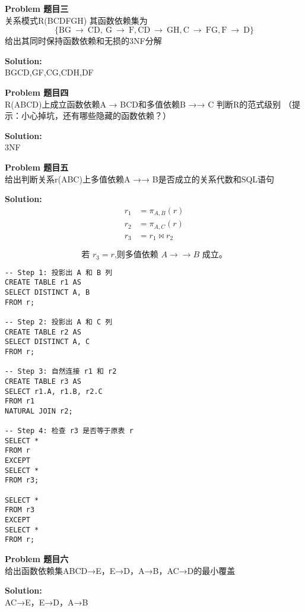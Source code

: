 \documentclass[12pt]{article} %
\newenvironment{problem}[2][Problem]
    { \begin{mdframed}[backgroundcolor=gray!20] \textbf{#1 #2} \\}
    {  \end{mdframed}}
\newenvironment{solution}
    { \begin{mdframed} \textbf{Solution:} \\}
    {  \end{mdframed}}
\begin{document}
\begin{problem}{题目三}
关系模式R(BCDFGH)
其函数依赖集为
\[\{\mathrm{BG~\to~CD,~G~\to~F,CD~\to~GH,C~\to~FG,F~\to~D}\}\]
给出其同时保持函数依赖和无损的3NF分解
\end{problem}
\begin{solution}
{BGCD},{GF},{CG},{CDH},{DF}
\end{solution}

\begin{problem}{题目四}
  R(ABCD)上成立函数依赖A → BCD和多值依赖B →→ C
    判断R的范式级别  
  （提示：小心掉坑，还有哪些隐藏的函数依赖？）
\end{problem}
\begin{solution}
  3NF
\end{solution}

\begin{problem}{题目五}
  给出判断关系r(ABC)上多值依赖A →→ B是否成立的关系代数和SQL语句
\end{problem}
\begin{solution}
\[\begin{aligned}r_1&=\pi_{A,B}(r)\\r_2&=\pi_{A,C}(r)\\r_3&=r_1\bowtie r_2\end{aligned}\]

\[\text{若 }r_{3}=r\text{,则多值依赖 }A\to\to B\text{ 成立。}\]

\begin{verbatim}
-- Step 1: 投影出 A 和 B 列
CREATE TABLE r1 AS
SELECT DISTINCT A, B
FROM r;

-- Step 2: 投影出 A 和 C 列
CREATE TABLE r2 AS
SELECT DISTINCT A, C
FROM r;

-- Step 3: 自然连接 r1 和 r2
CREATE TABLE r3 AS
SELECT r1.A, r1.B, r2.C
FROM r1
NATURAL JOIN r2;

-- Step 4: 检查 r3 是否等于原表 r
SELECT *
FROM r
EXCEPT
SELECT *
FROM r3;

SELECT *
FROM r3
EXCEPT
SELECT *
FROM r;
\end{verbatim}

\end{solution}

\begin{problem}{题目六}
  给出函数依赖集{ABCD→E，E→D，A→B，AC→D}的最小覆盖
\end{problem}
\begin{solution}
  {AC→E，E→D，A→B}
\end{solution}

% 
% 
\end{document}
